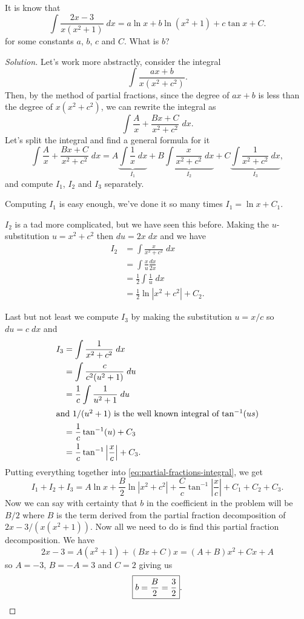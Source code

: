 \begin{problem}[Spring 2014, \# 5]
It is know that
\[
\int\frac{2x-3}{x(x^2+1)}\;dx=a\ln x+b\ln(x^2+1)+c\tan x+C.
\]
for some constants $a$, $b$, $c$ and $C$. What is $b$?
\end{problem}
\begin{proof}[Solution]
Let's work more abstractly, consider the integral
\[
\int\frac{ax+b}{x(x^2+c^2)}.
\]
Then, by the method of partial fractions, since the degree of $ax+b$ is
less than the degree of $x(x^2+c^2)$, we can rewrite the integral as
\[
\int\frac{A}{x}+\frac{Bx+C}{x^2+c^2}\;dx.
\]
Let's split the integral and find a general formula for it
\begin{equation}
\label{eq:partial-fractions-integral}
\int\frac{A}{x}+\frac{Bx+C}{x^2+c^2}\;dx
=A\underbrace{\int\frac{1}{x}\;dx}_{I_1}
+B\underbrace{\int\frac{x}{x^2+c^2}\;dx}_{I_2}
+C\underbrace{\int\frac{1}{x^2+c^2}\;dx}_{I_3},
\end{equation}
and compute $I_1$, $I_2$ and $I_3$ separately.

Computing $I_1$ is easy enough, we've done it so many times
$I_1=\ln x+C_1$.

$I_2$ is a tad more complicated, but we have seen this before. Making the
$u$-substitution $u=x^2+c^2$ then $du=2x\;dx$ and we have
\begin{align*}
I_2&=\int\frac{x}{x^2+c^2}\;dx\\
   &=\int\frac{x}{u}\frac{dx}{2x}\\
   &=\frac{1}{2}\int\frac{1}{u}\;dx\\
   &=\frac{1}{2}\ln\left|x^2+c^2\right|+C_2.
\end{align*}

Last but not least we compute $I_3$ by making the substitution $u=x/c$ so
$du=c\;dx$ and
\begin{align*}
I_3&=\int\frac{1}{x^2+c^2}\;dx\\
   &=\int\frac{c}{c^2(u^2+1)}\;du\\
   &=\frac{1}{c}\int\frac{1}{u^2+1}\;du\\
\intertext{and $1/(u^2+1)$ is the well known integral of $\tan^{-1}(us)$}
   &=\frac{1}{c}\tan^{-1}(u)+C_3\\
   &=\frac{1}{c}\tan^{-1}\left|\frac{x}{c}\right|+C_3.
\end{align*}
Putting everything together into \eqref{eq:partial-fractions-integral}, we
get
\begin{equation}
\label{eq:total-partial-int}
I_1+I_2+I_3=A\ln
x+\frac{B}{2}\ln\left|x^2+c^2\right|+\frac{C}{c}\tan^{-1}\left|\frac{x}{c}\right|+C_1+C_2+C_3.
\end{equation}
Now we can say with certainty that $b$ in the coefficient in the problem
will be $B/2$ where $B$ is the term derived from the partial fraction
decomposition of $2x-3/(x(x^2+1))$. Now all we need to do is find this
partial fraction decomposition. We have
\[
2x-3=A(x^2+1)+(Bx+C)x=(A+B)x^2+Cx+A
\]
so $A=-3$, $B=-A=3$ and $C=2$ giving us
\[
\boxed{b=\frac{B}{2}=\frac{3}{2}}.\qedhere
\]
\end{proof}


